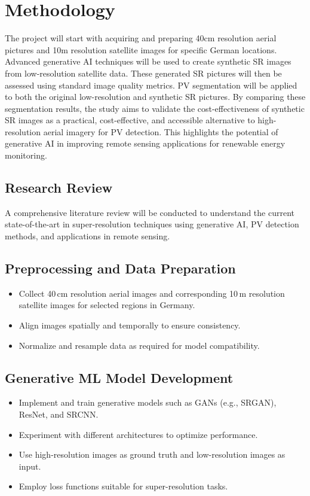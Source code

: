 \chapter{Methodology}\label{chapter:methodology}

The project will start with acquiring and preparing 40cm resolution aerial pictures and 10m resolution satellite images for specific German locations. Advanced generative AI techniques will be used to create synthetic SR images from low-resolution satellite data. These generated SR pictures will then be assessed using standard image quality metrics. PV segmentation will be applied to both the original low-resolution and synthetic SR pictures. By comparing these segmentation results, the study aims to validate the cost-effectiveness of synthetic SR images as a practical, cost-effective, and accessible alternative to high-resolution aerial imagery for PV detection. This highlights the potential of generative AI in improving remote sensing applications for renewable energy monitoring.

\section{Research Review}

A comprehensive literature review will be conducted to understand the current state-of-the-art in super-resolution techniques using generative AI, PV detection methods, and applications in remote sensing.

\section{Preprocessing and Data Preparation}

\begin{itemize}
  \item Collect 40\,cm resolution aerial images and corresponding 10\,m resolution satellite images for selected regions in Germany.
  \item Align images spatially and temporally to ensure consistency.
  \item Normalize and resample data as required for model compatibility.
\end{itemize}

\section{Generative ML Model Development}

\begin{itemize}
  \item Implement and train generative models such as GANs (e.g., SRGAN), ResNet, and SRCNN.
  \item Experiment with different architectures to optimize performance.
  \item Use high-resolution images as ground truth and low-resolution images as input.
  \item Employ loss functions suitable for super-resolution tasks.
\end{itemize}

